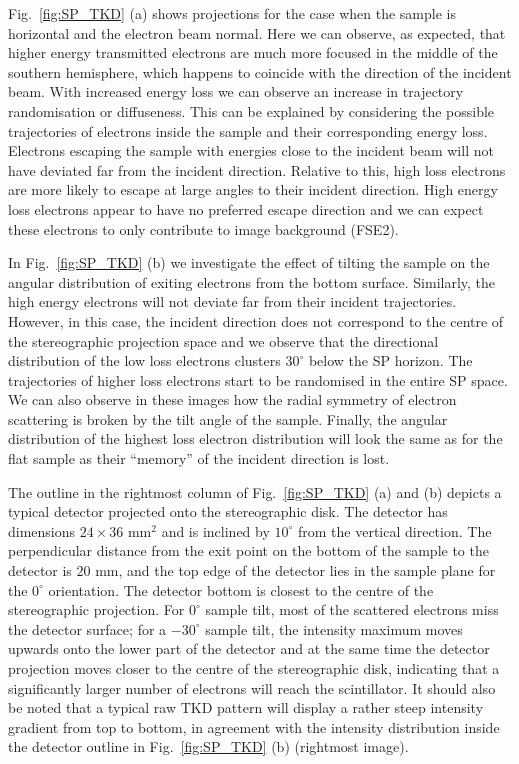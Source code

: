 Fig.~\ref{fig:SP_TKD} (a) shows projections for the case when the sample is horizontal and the electron beam normal. Here we can observe, as expected, that higher energy transmitted electrons are much more focused in the middle of the southern hemisphere, which happens to coincide with the direction of the incident beam. With increased energy loss we can observe an increase in trajectory randomisation or diffuseness. This can be explained by considering the possible trajectories of electrons inside the sample and their corresponding energy loss. Electrons escaping the sample with energies close to the incident beam will not have deviated far from the incident direction. Relative to this, high loss electrons are more likely to escape at large angles to their incident direction. High energy loss electrons appear to have no preferred escape direction and we can expect these electrons to only contribute to image background (FSE2). 

In Fig.~\ref{fig:SP_TKD} (b) we investigate the effect of tilting the sample on the angular distribution of exiting electrons from the bottom surface. Similarly, the high energy electrons will not deviate far from their incident trajectories. However, in this case, the incident direction does not correspond to the centre of the stereographic projection space and we observe that the directional distribution of the low loss electrons clusters  $30^{\circ}$ below the SP horizon. The trajectories of higher loss electrons start to be randomised in the entire SP space. We can also observe in these images how the radial symmetry of electron scattering is broken by the tilt angle of the sample. Finally, the angular distribution of the highest loss electron distribution will look the same as for the flat sample as their ``memory'' of the incident direction is lost.


The outline in the rightmost column of Fig.~\ref{fig:SP_TKD} (a) and (b) depicts a typical detector projected onto the stereographic disk.  The detector has dimensions $24\times 36$ mm$^2$ and is inclined by $10^{\circ}$ from the vertical direction.  The perpendicular distance from the exit point on the bottom of the sample to the detector is $20$ mm, and the top edge of the detector lies in the sample plane for the $0^{\circ}$ orientation.  The detector bottom is closest to the centre of the stereographic projection.  For $0^{\circ}$ sample tilt, most of the scattered electrons miss the detector surface; for a $-30^{\circ}$ sample tilt, the intensity maximum moves upwards onto the lower part of the detector and at the same time the detector projection moves closer to the centre of the stereographic disk, indicating that a significantly larger number of electrons will reach the scintillator.  It should also be noted that a typical raw TKD pattern will display a rather steep intensity gradient from top to bottom, in agreement with the intensity distribution inside the detector outline in Fig.~\ref{fig:SP_TKD} (b) (rightmost image).



